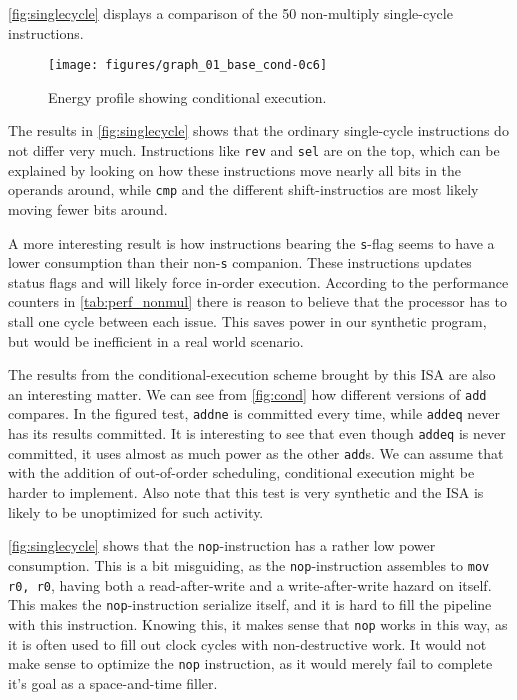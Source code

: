 \autoref{fig:singlecycle} displays a comparison of the 50 non-multiply
single-cycle instructions.

\begin{figure}
    \centering
    \texttt{[image: figures/graph\_01\_base\_cond-0c6]}
    \caption{Energy profile showing conditional execution.}
    \label{fig:cond}
\end{figure}

The results in \autoref{fig:singlecycle} shows that the ordinary single-cycle
instructions do not differ very much. Instructions like \texttt{rev} and
\texttt{sel} are on the top, which can be explained by looking on how these
instructions move nearly all bits in the operands around, while \texttt{cmp} and
the different shift-instructios are most likely moving fewer bits around.

A more interesting result is how instructions bearing the \texttt{s}-flag seems
to have a lower consumption than their non-\texttt{s} companion. These
instructions updates status flags and will likely force in-order execution.
According to the performance counters in \autoref{tab:perf_nonmul} there is
reason to believe that the processor has to stall one cycle between each issue.
This saves power in our synthetic program, but would be inefficient in a real
world scenario.

The results from the conditional-execution scheme brought by this ISA are also
an interesting matter. We can see from \autoref{fig:cond} how different versions
of \texttt{add} compares. In the figured test, \texttt{addne} is committed every
time, while \texttt{addeq} never has its results committed. It is interesting to
see that even though \texttt{addeq} is never committed, it uses almost as much
power as the other \texttt{add}s. We can assume that with the addition of
out-of-order scheduling, conditional execution might be harder to implement.
Also note that this test is very synthetic and the ISA is likely to be
unoptimized for such activity.

\autoref{fig:singlecycle} shows that the \texttt{nop}-instruction has a rather
low power consumption. This is a bit misguiding, as the \texttt{nop}-instruction
assembles to \texttt{mov r0, r0}, having both a read-after-write and a
write-after-write hazard on itself. This makes the \texttt{nop}-instruction
serialize itself, and it is hard to fill the pipeline with this instruction.
Knowing this, it makes sense that \texttt{nop} works in this way, as it is often
used to fill out clock cycles with non-destructive work. It would not make sense
to optimize the \texttt{nop} instruction, as it would merely fail to complete
it's goal as a space-and-time filler.

